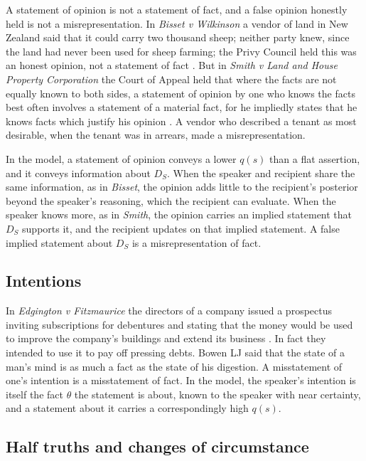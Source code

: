 A statement of opinion is not a statement of fact, and a false opinion honestly held is not a misrepresentation. In \emph{Bisset v Wilkinson} a vendor of land in New Zealand said that it could carry two thousand sheep; neither party knew, since the land had never been used for sheep farming; the Privy Council held this was an honest opinion, not a statement of fact \citep{bisset1927}. But in \emph{Smith v Land and House Property Corporation} the Court of Appeal held that where the facts are not equally known to both sides, a statement of opinion by one who knows the facts best often involves a statement of a material fact, for he impliedly states that he knows facts which justify his opinion \citep{smithland1884}. A vendor who described a tenant as most desirable, when the tenant was in arrears, made a misrepresentation.

In the model, a statement of opinion conveys a lower $q(s)$ than a flat assertion, and it conveys information about $D_S$. When the speaker and recipient share the same information, as in \emph{Bisset}, the opinion adds little to the recipient's posterior beyond the speaker's reasoning, which the recipient can evaluate. When the speaker knows more, as in \emph{Smith}, the opinion carries an implied statement that $D_S$ supports it, and the recipient updates on that implied statement. A false implied statement about $D_S$ is a misrepresentation of fact.

\subsection{Intentions}

In \emph{Edgington v Fitzmaurice} the directors of a company issued a prospectus inviting subscriptions for debentures and stating that the money would be used to improve the company's buildings and extend its business \citep{edgington1885}. In fact they intended to use it to pay off pressing debts. Bowen LJ said that the state of a man's mind is as much a fact as the state of his digestion. A misstatement of one's intention is a misstatement of fact. In the model, the speaker's intention is itself the fact $\theta$ the statement is about, known to the speaker with near certainty, and a statement about it carries a correspondingly high $q(s)$.

\subsection{Half truths and changes of circumstance}

